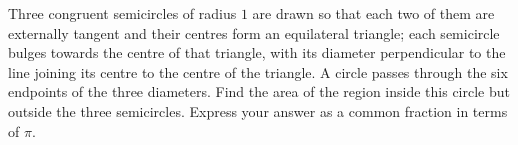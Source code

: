 Three congruent semicircles of radius $1$ are drawn so that each two of them are externally tangent and their centres form an equilateral triangle; each semicircle bulges towards the centre of that triangle, with its diameter perpendicular to the line joining its centre to the centre of the triangle. A circle passes through the six endpoints of the three diameters. Find the area of the region inside this circle but outside the three semicircles. Express your answer as a common fraction in terms of $\pi$.
